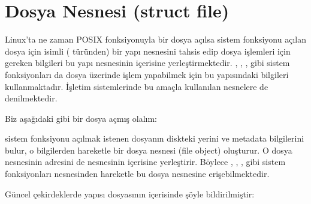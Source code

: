 \documentclass[a4paper,10pt,turkish]{sphinxmanual}
\begin{document}
\section{Dosya Nesnesi (struct file)}
\label{\detokenize{filesystem1:dosya-nesnesi-struct-file}}
\sphinxAtStartPar
Linux’ta ne zaman  POSIX fonksiyonuyla bir dosya açılsa  sistem fonksiyonu
açılan dosya için  isimli ( türünden) bir yapı nesnesini tahsis edip
dosya işlemleri için gereken bilgileri bu yapı nesnesinin içerisine yerleştirmektedir.
, , ,  gibi sistem fonksiyonları da dosya
üzerinde işlem yapabilmek için bu  yapısındaki bilgileri kullanmaktadır. İşletim
sistemlerinde bu amaçla kullanılan nesnelere  de denilmektedir.

\sphinxAtStartPar
Biz aşağıdaki gibi bir dosya açmış olalım:

\begin{sphinxVerbatim}[commandchars=\\\{\}]
\end{sphinxVerbatim}

\sphinxAtStartPar
{} sistem fonksiyonu açılmak istenen dosyanın diskteki yerini ve metadata bilgilerini
bulur, o bilgilerden hareketle bir dosya nesnesi (file object) oluşturur. O dosya nesnesinin
adresini de  nesnesinin içerisine yerleştirir. Böylece ,
, ,  gibi sistem fonksiyonları  nesnesinden
hareketle bu dosya nesnesine erişebilmektedir.

\sphinxAtStartPar
Güncel çekirdeklerde  yapısı  dosyasının içerisinde şöyle
bildirilmiştir:
\end{document}
